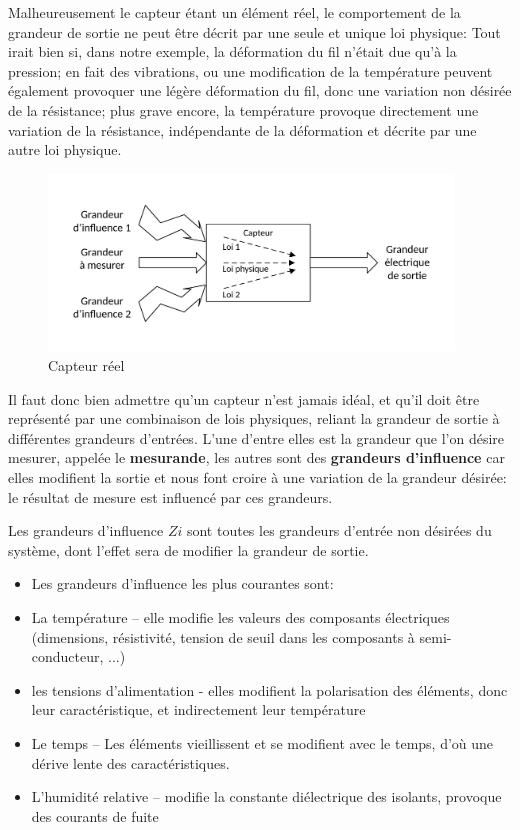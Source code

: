 \documentclass[main.tex]{subfiles}
\begin{document}
Malheureusement le capteur étant un élément réel, le comportement de la grandeur de sortie ne peut être décrit par une seule et unique loi physique: Tout irait bien si, dans notre exemple, la déformation du fil n'était due qu'à la pression; en fait des vibrations, ou une modification de la température peuvent également provoquer une légère déformation du fil, donc une variation non désirée de la résistance; plus grave encore, la température provoque directement une variation de la résistance, indépendante de la déformation et décrite par une autre loi physique.
\begin{figure}
    \centering
    \includegraphics[width=0.96\textwidth]{assets/figures/capteur-reel.pdf}
    \caption{Capteur réel}
    \label{fig:Grandeur_Influence}
\end{figure}

Il faut donc bien admettre qu'un capteur n'est jamais idéal, et qu'il doit être représenté par une combinaison de lois physiques, reliant la grandeur de sortie à différentes grandeurs d'entrées. L'une d'entre elles est la grandeur que l'on désire mesurer, appelée le \textbf{mesurande}, les autres sont des \textbf{grandeurs d'influence} car elles modifient la sortie et nous font croire à une variation de la grandeur désirée: le résultat de mesure est influencé par ces grandeurs.

\begin{definition}
    Les grandeurs d'influence $Zi$ sont toutes les grandeurs d'entrée non désirées du système, dont l'effet sera de modifier la grandeur de sortie.
\end{definition}

\begin{itemize}
    \item Les grandeurs d'influence les plus courantes sont:
    \item La température -- elle modifie les valeurs des composants électriques (dimensions, résistivité, tension de seuil dans les composants à semi-conducteur, ...)
    \item les tensions d'alimentation - elles modifient la polarisation des éléments, donc leur caractéristique, et indirectement leur température
    \item Le temps -- Les éléments vieillissent et se modifient avec le temps, d'où une dérive lente des caractéristiques.
    \item L'humidité relative -- modifie la constante diélectrique des isolants, provoque des courants de fuite
\end{itemize}
\end{document}
